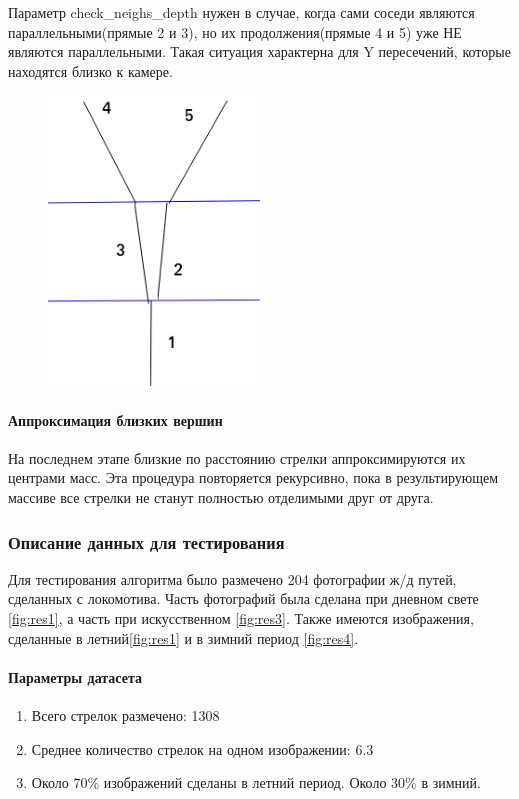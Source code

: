 \newpage
Параметр check\_neighs\_depth нужен в случае, когда сами соседи являются параллельными(прямые 2 и 3), но их продолжения(прямые 4 и 5) уже НЕ являются параллельными. Такая ситуация характерна для Y пересечений, которые находятся близко к камере.
\begin{figure}[!h]
	\centering
	\includegraphics[width=0.5\textwidth, height=0.4\textheight]{pictures/intersection_example1}
	\caption{}
	\label{fig:intersectionexample1}
\end{figure}
\paragraph{Аппроксимация близких вершин}
На последнем этапе близкие по расстоянию стрелки аппроксимируются их центрами масс.
Эта процедура повторяется рекурсивно, пока в результирующем массиве все стрелки не станут полностью отделимыми друг от друга.

\newpage			
\subsubsection{Описание данных для тестирования}
Для тестирования алгоритма было размечено 204 фотографии ж/д путей, сделанных с локомотива. Часть фотографий была сделана при дневном свете \ref{fig:res1}, а часть при искусственном \ref{fig:res3}. Также имеются изображения, сделанные в летний\ref{fig:res1} и в зимний период \ref{fig:res4}.
\paragraph{Параметры датасета}
\begin{enumerate}
	\item Всего стрелок размечено: 1308
	\item Среднее количество стрелок на одном изображении: 6.3
	\item Около 70\% изображений сделаны в летний период. Около 30\% в зимний.
\end{enumerate}


